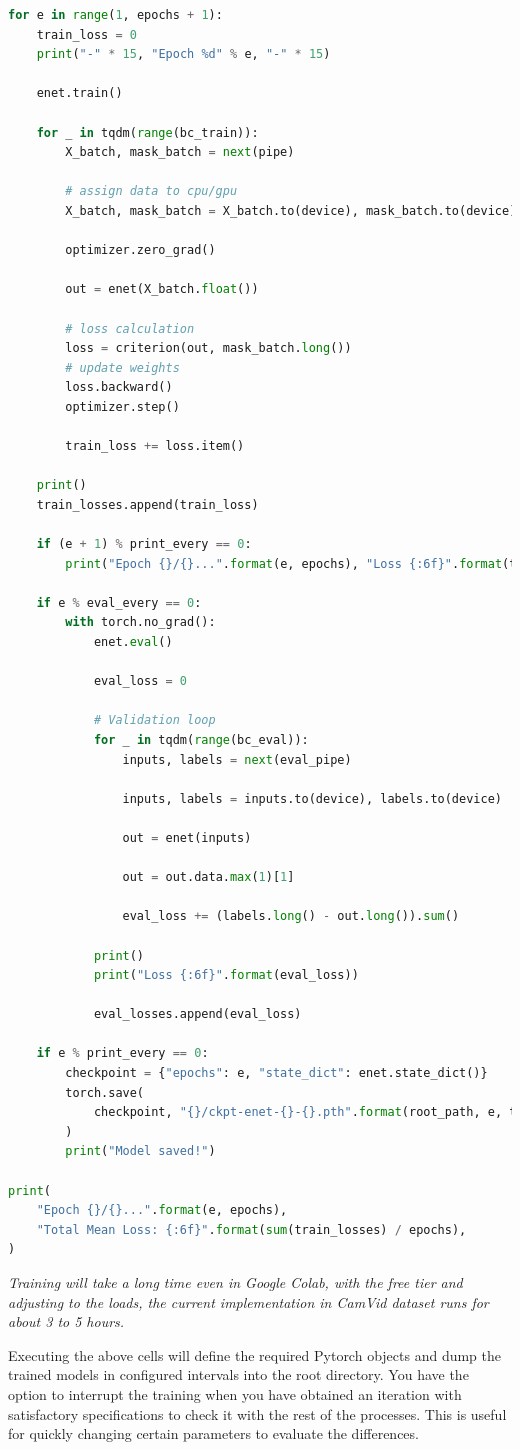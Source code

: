 \begin{enumerate}
\begin{lstlisting}[language=Python]
for e in range(1, epochs + 1):
    train_loss = 0
    print("-" * 15, "Epoch %d" % e, "-" * 15)

    enet.train()

    for _ in tqdm(range(bc_train)):
        X_batch, mask_batch = next(pipe)

        # assign data to cpu/gpu
        X_batch, mask_batch = X_batch.to(device), mask_batch.to(device)

        optimizer.zero_grad()

        out = enet(X_batch.float())

        # loss calculation
        loss = criterion(out, mask_batch.long())
        # update weights
        loss.backward()
        optimizer.step()

        train_loss += loss.item()

    print()
    train_losses.append(train_loss)

    if (e + 1) % print_every == 0:
        print("Epoch {}/{}...".format(e, epochs), "Loss {:6f}".format(train_loss))

    if e % eval_every == 0:
        with torch.no_grad():
            enet.eval()

            eval_loss = 0

            # Validation loop
            for _ in tqdm(range(bc_eval)):
                inputs, labels = next(eval_pipe)

                inputs, labels = inputs.to(device), labels.to(device)

                out = enet(inputs)

                out = out.data.max(1)[1]

                eval_loss += (labels.long() - out.long()).sum()

            print()
            print("Loss {:6f}".format(eval_loss))

            eval_losses.append(eval_loss)

    if e % print_every == 0:
        checkpoint = {"epochs": e, "state_dict": enet.state_dict()}
        torch.save(
            checkpoint, "{}/ckpt-enet-{}-{}.pth".format(root_path, e, train_loss)
        )
        print("Model saved!")

print(
    "Epoch {}/{}...".format(e, epochs),
    "Total Mean Loss: {:6f}".format(sum(train_losses) / epochs),
)
                        \end{lstlisting}
          \textit{Training will take a long time even in Google Colab, with the free tier and adjusting to the loads, the current implementation in CamVid dataset runs for about 3 to 5 hours.}
\end{enumerate}
Executing the above cells will define the required Pytorch objects and dump the trained models in configured intervals into the root directory. You have the option to interrupt the training when you have obtained an iteration with satisfactory specifications to check it with the rest of the processes. This is useful for quickly changing certain parameters to evaluate the differences.

